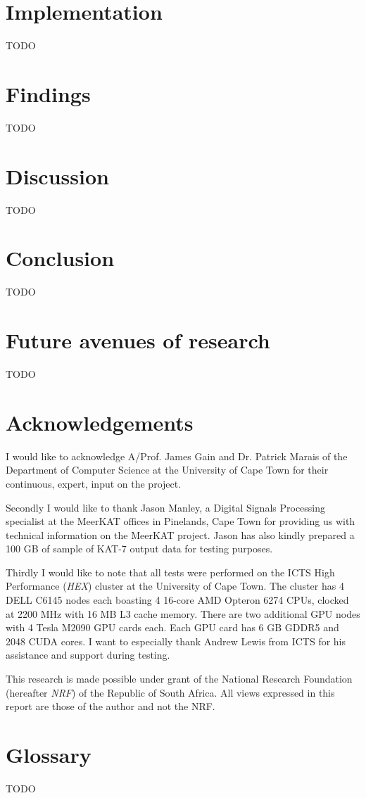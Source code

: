 \documentclass{acm_proc_article-sp}
\begin{document}
\section{Implementation}
{\color{red}TODO}
\section{Findings}
{\color{red}TODO}
\section{Discussion}
{\color{red}TODO}
\section{Conclusion}
{\color{red}TODO}
\section{Future avenues of research}
{\color{red}TODO}
\section{Acknowledgements}
I would like to acknowledge A/Prof. James Gain and Dr. Patrick Marais of the Department of Computer Science at the University of Cape Town for their continuous, expert, input on the project.

Secondly I would like to thank Jason Manley, a Digital Signals Processing specialist at the MeerKAT offices in Pinelands, Cape Town for providing us with technical information
on the MeerKAT project. Jason has also kindly prepared a 100 GB of sample of KAT-7 output data for testing purposes.

Thirdly I would like to note that all tests were performed on the ICTS High Performance (\textit{HEX}) cluster at the University of Cape Town. The cluster has 4 DELL C6145 nodes each boasting 4 16-core
AMD Opteron 6274 CPUs, clocked at 2200 MHz with 16 MB L3 cache memory. There are two additional GPU nodes with 4 Tesla M2090 GPU cards each. Each GPU card has 6 GB GDDR5 and 2048 CUDA cores. I want to 
especially thank Andrew Lewis from ICTS for his assistance and support during testing.

This research is made possible under grant of the National Research Foundation (hereafter \textit{NRF}) of the Republic of South Africa. All views expressed in this report are those of the author and not the NRF.
\section{Glossary}
{\color{red}TODO}


\end{document}
